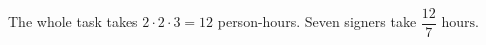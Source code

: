 The whole task takes $2\cdot2\cdot3=12$ person-hours. Seven signers take $\boxed{\dfrac{12}{7}\text{ hours}}$.
